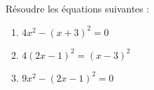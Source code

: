 
\begin{exercice}\label{exosmath-0666}

    Résoudre les équations suivantes :
        \begin{enumerate}
            \item
        $4x^2-(x+3)^2=0$
    \item
        \( 4(2x-1)^2=(x-3)^2\)
    \item
        \( 9x^2-(2x-1)^2=0\)
        \end{enumerate}

\end{exercice}
